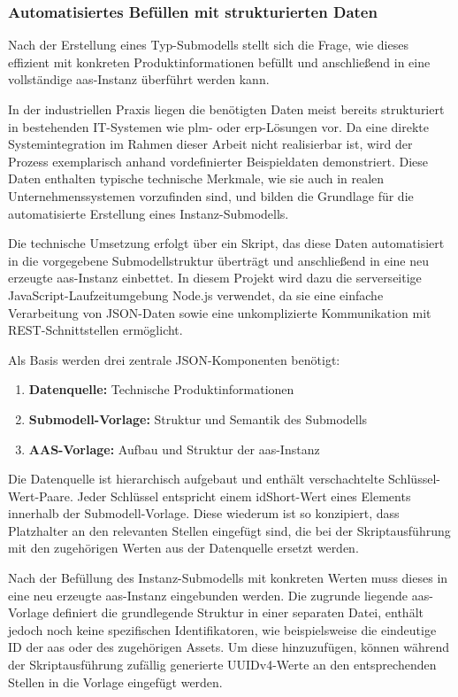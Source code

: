 \subsubsection{Automatisiertes Befüllen mit strukturierten Daten}
Nach der Erstellung eines Typ-Submodells stellt sich die Frage, wie dieses effizient mit konkreten Produktinformationen befüllt und anschließend in eine vollständige \acs{aas}-Instanz überführt werden kann.

In der industriellen Praxis liegen die benötigten Daten meist bereits strukturiert in bestehenden IT-Systemen wie \acs{plm}- oder \acs{erp}-Lösungen vor.
Da eine direkte Systemintegration im Rahmen dieser Arbeit nicht realisierbar ist, wird der Prozess exemplarisch anhand vordefinierter Beispieldaten demonstriert.
Diese Daten enthalten typische technische Merkmale, wie sie auch in realen Unternehmenssystemen vorzufinden sind, und bilden die Grundlage für die automatisierte Erstellung eines Instanz-Submodells.

Die technische Umsetzung erfolgt über ein Skript, das diese Daten automatisiert in die vorgegebene Submodellstruktur überträgt und anschließend in eine neu erzeugte \acs{aas}-Instanz einbettet.
In diesem Projekt wird dazu die serverseitige JavaScript-Laufzeitumgebung Node.js \cite{nodejs} verwendet, da sie eine einfache Verarbeitung von JSON-Daten sowie eine unkomplizierte Kommunikation mit REST-Schnittstellen ermöglicht. 

Als Basis werden drei zentrale JSON-Komponenten benötigt:

\begin{enumerate}[noitemsep, leftmargin=*, label=\textbf{\arabic*.}]
    \item \textbf{Datenquelle:} Technische Produktinformationen
    \item \textbf{Submodell-Vorlage:} Struktur und Semantik des Submodells
    \item \textbf{AAS-Vorlage:} Aufbau und Struktur der \acs{aas}-Instanz
\end{enumerate}

Die Datenquelle ist hierarchisch aufgebaut und enthält verschachtelte Schlüssel-Wert-Paare. 
Jeder Schlüssel entspricht einem idShort-Wert eines Elements innerhalb der Submodell-Vorlage. 
Diese wiederum ist so konzipiert, dass Platzhalter an den relevanten Stellen eingefügt sind, die bei der Skriptausführung mit den zugehörigen Werten aus der Datenquelle ersetzt werden.

Nach der Befüllung des Instanz-Submodells mit konkreten Werten muss dieses in eine neu erzeugte \acs{aas}-Instanz eingebunden werden.
Die zugrunde liegende \acs{aas}-Vorlage definiert die grundlegende Struktur in einer separaten Datei, enthält jedoch noch keine spezifischen Identifikatoren, wie beispielsweise die eindeutige ID der \acs{aas} oder des zugehörigen Assets.
Um diese hinzuzufügen, können während der Skriptausführung zufällig generierte UUIDv4-Werte an den entsprechenden Stellen in die Vorlage eingefügt werden.

